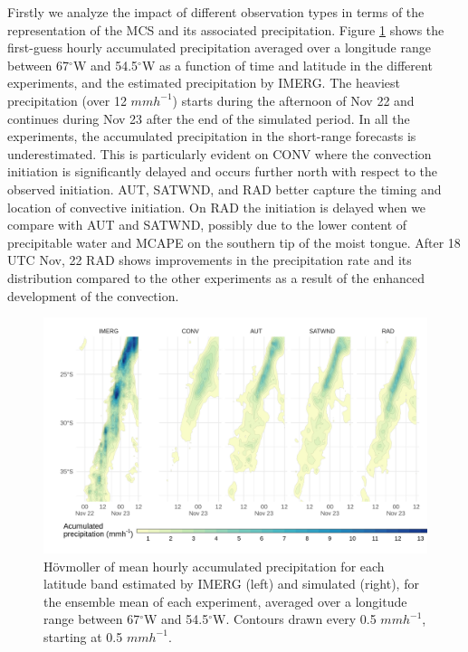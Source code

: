 \documentclass[final,5p,times,twocolumn,authoryear]{elsarticle} %
\begin{document}
Firstly we analyze the impact of different observation types in terms of the representation of the MCS and its associated precipitation. Figure \ref{fig:pp-hov} shows the first-guess hourly accumulated precipitation averaged over a longitude range between 67\(^{\circ}\)W and 54.5\(^{\circ}\)W as a function of time and latitude in the different experiments, and the estimated precipitation by IMERG. The heaviest precipitation (over 12 \(mmh^{-1}\)) starts during the afternoon of Nov 22 and continues during Nov 23 after the end of the simulated period. In all the experiments, the accumulated precipitation in the short-range forecasts is underestimated. This is particularly evident on CONV where the convection initiation is significantly delayed and occurs further north with respect to the observed initiation. AUT, SATWND, and RAD better capture the timing and location of convective initiation. On RAD the initiation is delayed when we compare with AUT and SATWND, possibly due to the lower content of precipitable water and MCAPE on the southern tip of the moist tongue. After 18 UTC Nov, 22 RAD shows improvements in the precipitation rate and its distribution compared to the other experiments as a result of the enhanced development of the convection.



\begin{figure}[h]
\includegraphics{../figures/pp-hov-1} \caption{Hövmoller of mean hourly accumulated precipitation for each latitude band estimated by IMERG (left) and simulated (right), for the ensemble mean of each experiment, averaged over a longitude range between 67\(^{\circ}\)W and 54.5\(^{\circ}\)W. Contours drawn every 0.5 \(mmh^{-1}\), starting at 0.5 \(mmh^{-1}\).}\label{fig:pp-hov}
\end{figure}
\end{document}

